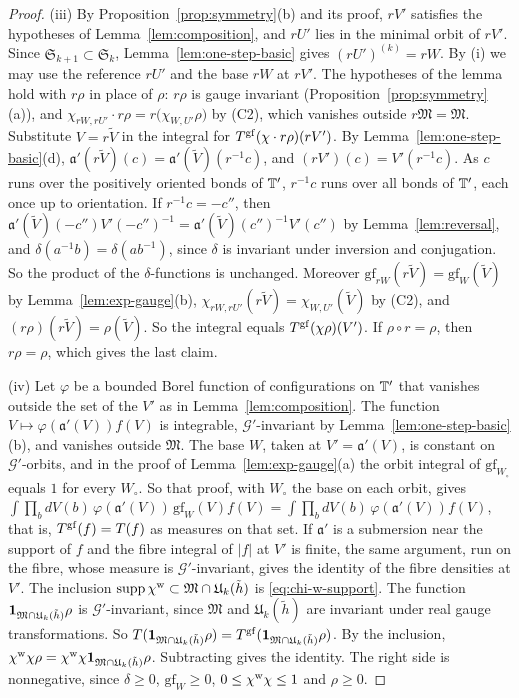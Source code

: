 \begin{proof}
(iii) By Proposition~\ref{prop:symmetry}(b) and its proof, $rV'$ satisfies the hypotheses of Lemma~\ref{lem:composition}, and $rU'$ lies in the minimal orbit of $rV'$. Since $\mathfrak S_{k+1}\subset\mathfrak S_k$, Lemma~\ref{lem:one-step-basic} gives $(rU')^{(k)}=rW$. By (i) we may use the reference $rU'$ and the base $rW$ at $rV'$. The hypotheses of the lemma hold with $r\rho$ in place of $\rho$: $r\rho$ is gauge invariant (Proposition~\ref{prop:symmetry}(a)), and $\chi_{rW,rU'}\cdot r\rho=r\big(\chi_{W,U'}\rho\big)$ by (C2), which vanishes outside $r\mathfrak M=\mathfrak M$. Substitute $V=r\tilde V$ in the integral for $T^{\rm gf}(\chi\cdot r\rho)(rV')$. By Lemma~\ref{lem:one-step-basic}(d), $\mathfrak a'(r\tilde V)(c)=\mathfrak a'(\tilde V)(r^{-1}c)$, and $(rV')(c)=V'(r^{-1}c)$. As $c$ runs over the positively oriented bonds of $\mathbb T'$, $r^{-1}c$ runs over all bonds of $\mathbb T'$, each once up to orientation. If $r^{-1}c=-c''$, then $\mathfrak a'(\tilde V)(-c'')V'(-c'')^{-1}=\mathfrak a'(\tilde V)(c'')^{-1}V'(c'')$ by Lemma~\ref{lem:reversal}, and $\delta(a^{-1}b)=\delta(ab^{-1})$, since $\delta$ is invariant under inversion and conjugation. So the product of the $\delta$-functions is unchanged. Moreover $\mathrm{gf}_{rW}(r\tilde V)=\mathrm{gf}_W(\tilde V)$ by Lemma~\ref{lem:exp-gauge}(b), $\chi_{rW,rU'}(r\tilde V)=\chi_{W,U'}(\tilde V)$ by (C2), and $(r\rho)(r\tilde V)=\rho(\tilde V)$. So the integral equals $T^{\rm gf}(\chi\rho)(V')$. If $\rho\circ r=\rho$, then $r\rho=\rho$, which gives the last claim.

(iv) Let $\varphi$ be a bounded Borel function of configurations on $\mathbb T'$ that vanishes outside the set of the $V'$ as in Lemma~\ref{lem:composition}. The function $V\mapsto\varphi(\mathfrak a'(V))f(V)$ is integrable, $\mathcal G'$-invariant by Lemma~\ref{lem:one-step-basic}(b), and vanishes outside $\mathfrak M$. The base $W$, taken at $V'=\mathfrak a'(V)$, is constant on $\mathcal G'$-orbits, and in the proof of Lemma~\ref{lem:exp-gauge}(a) the orbit integral of $\mathrm{gf}_{W_\circ}$ equals $1$ for every $W_\circ$. So that proof, with $W_\circ$ the base on each orbit, gives $\int\prod_bdV(b)\,\varphi(\mathfrak a'(V))\,\mathrm{gf}_W(V)f(V)=\int\prod_bdV(b)\,\varphi(\mathfrak a'(V))f(V)$, that is, $T^{\rm gf}(f)=T(f)$ as measures on that set. If $\mathfrak a'$ is a submersion near the support of $f$ and the fibre integral of $|f|$ at $V'$ is finite, the same argument, run on the fibre, whose measure is $\mathcal G'$-invariant, gives the identity of the fibre densities at $V'$. The inclusion $\operatorname{supp}\chi^{\rm w}\subset\mathfrak M\cap\mathfrak U_k(\tilde h)$ is \eqref{eq:chi-w-support}. The function $\mathbf 1_{\mathfrak M\cap\mathfrak U_k(\tilde h)}\rho$ is $\mathcal G'$-invariant, since $\mathfrak M$ and $\mathfrak U_k(\tilde h)$ are invariant under real gauge transformations. So $T(\mathbf 1_{\mathfrak M\cap\mathfrak U_k(\tilde h)}\rho)=T^{\rm gf}(\mathbf 1_{\mathfrak M\cap\mathfrak U_k(\tilde h)}\rho)$. By the inclusion, $\chi^{\rm w}\chi\rho=\chi^{\rm w}\chi\mathbf 1_{\mathfrak M\cap\mathfrak U_k(\tilde h)}\rho$. Subtracting gives the identity. The right side is nonnegative, since $\delta\ge0$, $\mathrm{gf}_W\ge0$, $0\le\chi^{\rm w}\chi\le1$ and $\rho\ge0$.
\end{proof}

